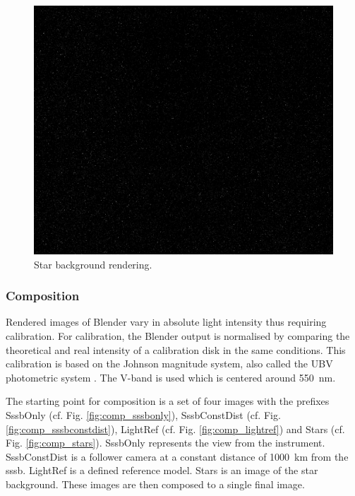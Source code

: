 \begin{figure}[htpb]
    \centering
    \includegraphics[width=\textwidth]{doc/thesis/0_figures/star_rendering/Stars_2017-08-15T115856-171000.png}
    \caption{Star background rendering.}
    \label{fig:star_rendering}
\end{figure}


\subsubsection{Composition} \label{sec:composition}
Rendered images of Blender vary in absolute light intensity thus requiring calibration. For calibration, the Blender output is normalised by comparing the theoretical and real intensity of a calibration disk in the same conditions. This calibration is based on the Johnson magnitude system, also called the UBV photometric system \cite{bessel1979ubvri}. The V-band is used which is centered around \SI{550}{\nano\meter}.

The starting point for composition is a set of four images with the prefixes SssbOnly (cf. Fig. \ref{fig:comp_sssbonly}), SssbConstDist (cf. Fig. \ref{fig:comp_sssbconstdist}), LightRef (cf. Fig. \ref{fig:comp_lightref}) and Stars (cf. Fig. \ref{fig:comp_stars}). SssbOnly represents the view from the instrument. SssbConstDist is a follower camera at a constant distance of \SI{1000}{\kilo\meter} from the \gls{sssb}. LightRef is a defined reference model. Stars is an image of the star background. These images are then composed to a single final image.

